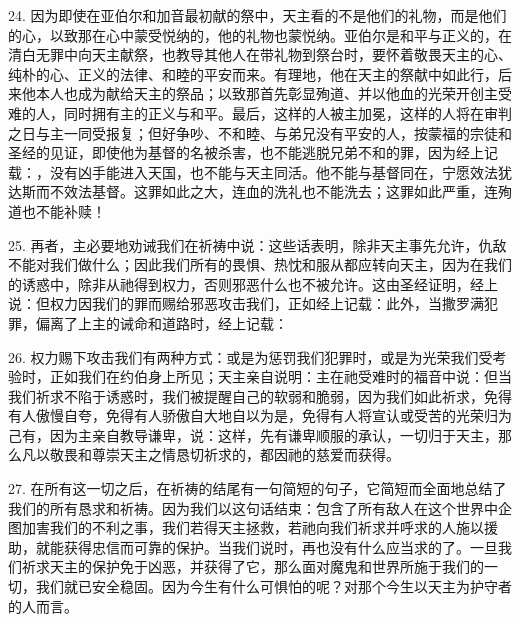 24. 因为即使在亚伯尔和加音最初献的祭中，天主看的不是他们的礼物，而是他们的心，以致那在心中蒙受悦纳的，他的礼物也蒙悦纳。亚伯尔是和平与正义的，在清白无罪中向天主献祭，也教导其他人在带礼物到祭台时，要怀着敬畏天主的心、纯朴的心、正义的法律、和睦的平安而来。有理地，他在天主的祭献中如此行，后来他本人也成为献给天主的祭品；以致那首先彰显殉道、并以他血的光荣开创主受难的人，同时拥有主的正义与和平。最后，这样的人被主加冕，这样的人将在审判之日与主一同受报复；但好争吵、不和睦、与弟兄没有平安的人，按蒙福的宗徒和圣经的见证，即使他为基督的名被杀害，也不能逃脱兄弟不和的罪，因为经上记载：，没有凶手能进入天国，也不能与天主同活。他不能与基督同在，宁愿效法犹达斯而不效法基督。这罪如此之大，连血的洗礼也不能洗去；这罪如此严重，连殉道也不能补赎！\par

25. 再者，主必要地劝诫我们在祈祷中说：这些话表明，除非天主事先允许，仇敌不能对我们做什么；因此我们所有的畏惧、热忱和服从都应转向天主，因为在我们的诱惑中，除非从祂得到权力，否则邪恶什么也不被允许。这由圣经证明，经上说：但权力因我们的罪而赐给邪恶攻击我们，正如经上记载：此外，当撒罗满犯罪，偏离了上主的诫命和道路时，经上记载：\par

26. 权力赐下攻击我们有两种方式：或是为惩罚我们犯罪时，或是为光荣我们受考验时，正如我们在约伯身上所见；天主亲自说明：主在祂受难时的福音中说：但当我们祈求不陷于诱惑时，我们被提醒自己的软弱和脆弱，因为我们如此祈求，免得有人傲慢自夸，免得有人骄傲自大地自以为是，免得有人将宣认或受苦的光荣归为己有，因为主亲自教导谦卑，说：这样，先有谦卑顺服的承认，一切归于天主，那么凡以敬畏和尊崇天主之情恳切祈求的，都因祂的慈爱而获得。\par

27. 在所有这一切之后，在祈祷的结尾有一句简短的句子，它简短而全面地总结了我们的所有恳求和祈祷。因为我们以这句话结束：包含了所有敌人在这个世界中企图加害我们的不利之事，我们若得天主拯救，若祂向我们祈求并呼求的人施以援助，就能获得忠信而可靠的保护。当我们说时，再也没有什么应当求的了。一旦我们祈求天主的保护免于凶恶，并获得了它，那么面对魔鬼和世界所施于我们的一切，我们就已安全稳固。因为今生有什么可惧怕的呢？对那个今生以天主为护守者的人而言。\par

